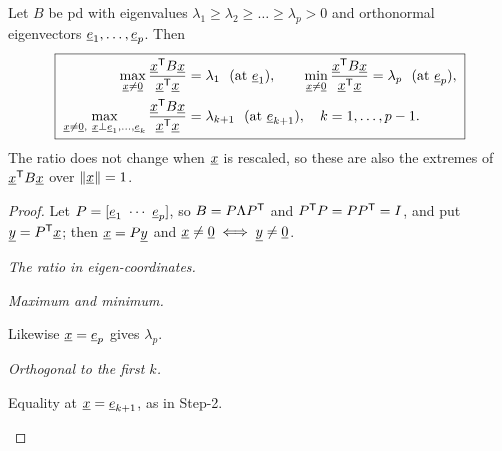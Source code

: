 \begin{theorem}
Let $B$ be pd with eigenvalues $\lambda_1\ge\lambda_2\ge\dots\ge\lambda_p>0$ and orthonormal eigenvectors $\underline{e}_1,\dots,\underline{e}_p$. Then
\[
  \boxed{\;\begin{aligned}
  \max_{\vect{x}\ne\vect{0}}\frac{\vect{x}\T B\vect{x}}{\vect{x}\T\vect{x}}&=\lambda_1\ \ (\text{at }\vect{e}_1),\qquad
  \min_{\vect{x}\ne\vect{0}}\frac{\vect{x}\T B\vect{x}}{\vect{x}\T\vect{x}}=\lambda_p\ \ (\text{at }\vect{e}_p),\\
  \max_{\vect{x}\ne\vect{0},\ \vect{x}\perp\vect{e}_1,\dots,\vect{e}_k}\frac{\vect{x}\T B\vect{x}}{\vect{x}\T\vect{x}}&=\lambda_{k+1}\ \ (\text{at }\vect{e}_{k+1}),\quad k=1,\dots,p-1.
  \end{aligned}\;}
\]
The ratio does not change when $\underline{x}$ is rescaled, so these are also the extremes of $\underline{x}^{\mathsf{T}} B\underline{x}$ over $\|\underline{x}\|=1$.
\end{theorem}
\begin{proof}
Let $P=[\vect{e}_1\ \cdots\ \vect{e}_p]$, so $B=P\Lambda P^{\mathsf{T}}$ and $P^{\mathsf{T}} P=PP^{\mathsf{T}}=I$, and put $\underline{y}=P^{\mathsf{T}}\underline{x}$; then $\underline{x}=P\underline{y}$ and $\underline{x}\ne\underline{0}\iff\underline{y}\ne\underline{0}$.
\begin{steps}
  \item \emph{The ratio in eigen-coordinates.}
  \begin{deriv}
  \end{deriv}
  \item \emph{Maximum and minimum.}
  \begin{deriv}
  \end{deriv}
  Likewise $\underline{x}=\underline{e}_p$ gives $\lambda_p$.
  \item \emph{Orthogonal to the first $k$.}
  \begin{deriv}
  \end{deriv}
  Equality at $\underline{x}=\underline{e}_{k+1}$, as in Step-2.\qedhere
\end{steps}
\end{proof}

